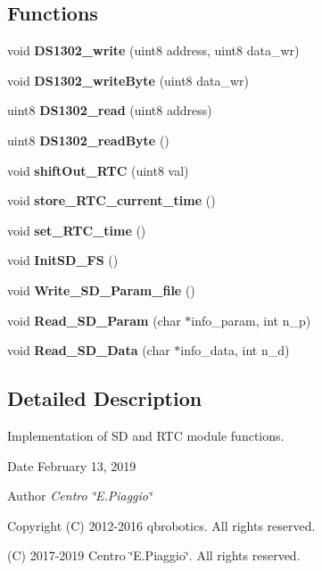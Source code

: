\subsection*{Functions}
\begin{DoxyCompactItemize}
\item 
\mbox{\label{_s_d___r_t_c__functions_8c_ae916e48139e2369b4295bc32b754cb09}} 
void {\bfseries D\+S1302\+\_\+write} (uint8 address, uint8 data\+\_\+wr)
\item 
\mbox{\label{_s_d___r_t_c__functions_8c_abf7dafb7cb2decd885c06cfd0d508a86}} 
void {\bfseries D\+S1302\+\_\+write\+Byte} (uint8 data\+\_\+wr)
\item 
\mbox{\label{_s_d___r_t_c__functions_8c_a648ecf3d4f3a92e6390945b156d5c98a}} 
uint8 {\bfseries D\+S1302\+\_\+read} (uint8 address)
\item 
\mbox{\label{_s_d___r_t_c__functions_8c_a961280caa20d802239a974419c19437e}} 
uint8 {\bfseries D\+S1302\+\_\+read\+Byte} ()
\item 
\mbox{\label{_s_d___r_t_c__functions_8c_a1f5533e91998b92926173f479322c7d9}} 
void {\bfseries shift\+Out\+\_\+\+R\+TC} (uint8 val)
\item 
\mbox{\label{_s_d___r_t_c__functions_8c_a262170705e582875a383a9f5c9b137a7}} 
void {\bfseries store\+\_\+\+R\+T\+C\+\_\+current\+\_\+time} ()
\item 
\mbox{\label{_s_d___r_t_c__functions_8c_ad0181162f59bf423c6d1dc1556afb6fc}} 
void {\bfseries set\+\_\+\+R\+T\+C\+\_\+time} ()
\item 
\mbox{\label{_s_d___r_t_c__functions_8c_a56466454f41dc875787a75f0d78b5602}} 
void {\bfseries Init\+S\+D\+\_\+\+FS} ()
\item 
\mbox{\label{_s_d___r_t_c__functions_8c_a5072914b0c92c6825bb196ba84b332c4}} 
void {\bfseries Write\+\_\+\+S\+D\+\_\+\+Param\+\_\+file} ()
\item 
\mbox{\label{_s_d___r_t_c__functions_8c_a9d056c3da2f8cd5c55be410e1959a485}} 
void {\bfseries Read\+\_\+\+S\+D\+\_\+\+Param} (char $\ast$info\+\_\+param, int n\+\_\+p)
\item 
\mbox{\label{_s_d___r_t_c__functions_8c_a0fbed516c0eda1c199a7641ca5c88692}} 
void {\bfseries Read\+\_\+\+S\+D\+\_\+\+Data} (char $\ast$info\+\_\+data, int n\+\_\+d)
\end{DoxyCompactItemize}


\subsection{Detailed Description}
Implementation of SD and R\+TC module functions. 

\begin{DoxyDate}{Date}
February 13, 2019 
\end{DoxyDate}
\begin{DoxyAuthor}{Author}
{\itshape Centro \char`\"{}\+E.\+Piaggio\char`\"{}} 
\end{DoxyAuthor}
\begin{DoxyCopyright}{Copyright}
(C) 2012-\/2016 qbrobotics. All rights reserved. 

(C) 2017-\/2019 Centro \char`\"{}\+E.\+Piaggio\char`\"{}. All rights reserved. 
\end{DoxyCopyright}
